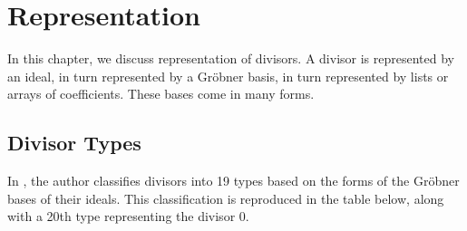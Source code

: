
\section{Representation}
\label{chap_representation}

In this chapter, we discuss representation of divisors.
A divisor is represented by an ideal, in turn represented by a Gr\"obner basis,
in turn represented by lists or arrays of coefficients.
These bases come in many forms.



\subsection{Divisor Types}

In \cite{arita05-2}, the author classifies divisors into 19 types
based on the forms of the Gr\"obner bases of their ideals.
This classification is reproduced in the table below,
along with a 20th type representing the divisor 0.

